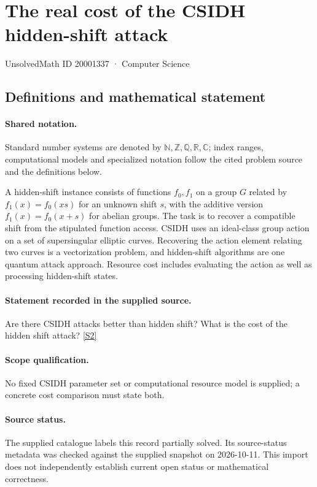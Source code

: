 \documentclass[11pt]{article}
\newcommand{\sref}[2]{\hyperlink{source:#1:#2}{[S#2]}}
\begin{document}
\setcounter{section}{20001336}
\section{The real cost of the CSIDH hidden-shift attack}\label{20001337}
{\small\sffamily UnsolvedMath ID 20001337 · Computer Science}
\subsection{Definitions and mathematical statement}

\paragraph{Shared notation.}Standard number systems are denoted by $\mathbb N,\mathbb Z,\mathbb Q,\mathbb R,\mathbb C$; index ranges, computational models and specialized notation follow the cited problem source and the definitions below.


A hidden-shift instance consists of functions $f_0,f_1$ on a group $G$ related by $f_1(x)=f_0(xs)$ for an unknown shift $s$, with the additive version $f_1(x)=f_0(x+s)$ for abelian groups. The task is to recover a compatible shift from the stipulated function access. CSIDH uses an ideal-class group action on a set of supersingular elliptic curves. Recovering the action element relating two curves is a vectorization problem, and hidden-shift algorithms are one quantum attack approach. Resource cost includes evaluating the action as well as processing hidden-shift states.
\paragraph{Statement recorded in the supplied source.}
Are there CSIDH attacks better than hidden shift? What is the cost of the hidden shift attack? \sref{20001337}{2}
\paragraph{Scope qualification.}
No fixed CSIDH parameter set or computational resource model is supplied; a concrete cost comparison must state both.
\paragraph{Source status.}
The supplied catalogue labels this record partially solved. Its source-status metadata was checked against the supplied snapshot on 2026-10-11. This import does not independently establish current open status or mathematical correctness.
\end{document}
